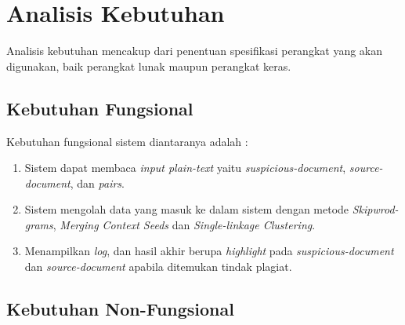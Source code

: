 \documentclass[../Book.tex]{subfiles}
\begin{document}
\section{Analisis Kebutuhan}
Analisis kebutuhan mencakup dari penentuan spesifikasi perangkat yang akan digunakan, baik perangkat lunak maupun perangkat keras.

\subsection{Kebutuhan Fungsional}
Kebutuhan fungsional sistem diantaranya adalah : 
\begin{enumerate}
	\item Sistem dapat membaca \textit{input plain-text} yaitu \textit{suspicious-document}, \textit{source-document}, dan \textit{pairs}.
	\item Sistem mengolah data yang masuk ke dalam sistem dengan metode \textit{Skipwrod-grams}, \textit{Merging Context Seeds} dan \textit{Single-linkage Clustering}.
	\item Menampilkan \textit{log}, dan hasil akhir berupa \textit{highlight} pada \textit{suspicious-document} dan \textit{source-document} apabila ditemukan tindak plagiat.
\end{enumerate}

\subsection{Kebutuhan Non-Fungsional}
\end{document}
